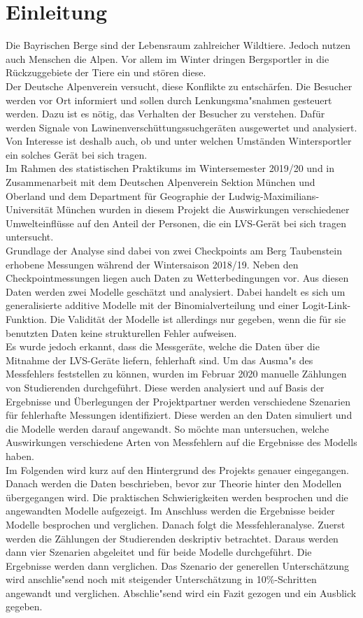 \documentclass[12pt]{scrreprt}
\begin{document}
\chapter{Einleitung}
Die Bayrischen Berge sind der Lebensraum zahlreicher Wildtiere. Jedoch nutzen auch Menschen die Alpen. Vor allem im Winter dringen Bergsportler in die Rückzuggebiete der Tiere ein und stören diese. \\
Der Deutsche Alpenverein versucht, diese Konflikte zu entschärfen. Die Besucher werden vor Ort informiert und sollen durch Lenkungsma"snahmen gesteuert werden. Dazu ist es nötig, das Verhalten der Besucher zu verstehen. Dafür werden Signale von Lawinenverschüttungssuchgeräten ausgewertet und analysiert. Von Interesse ist deshalb auch, ob und unter welchen Umständen Wintersportler ein solches Gerät bei sich tragen. \\
Im Rahmen des statistischen Praktikums im Wintersemester 2019/20 und in Zusammenarbeit mit dem Deutschen Alpenverein Sektion München und Oberland und dem Department für Geographie der Ludwig-Maximilians-Universität München wurden in diesem Projekt die Auswirkungen verschiedener Umwelteinflüsse auf den Anteil der Personen, die ein LVS-Gerät bei sich tragen untersucht. \\
Grundlage der Analyse sind dabei von zwei Checkpoints am Berg Taubenstein erhobene Messungen während der Wintersaison 2018/19. Neben den Checkpointmessungen liegen auch Daten zu Wetterbedingungen vor. Aus diesen Daten werden zwei Modelle geschätzt und analysiert. Dabei handelt es sich um generalisierte additive Modelle mit der Binomialverteilung und einer Logit-Link-Funktion. Die Validität der Modelle ist allerdings nur gegeben, wenn die für sie benutzten Daten keine strukturellen Fehler aufweisen. \\
Es wurde jedoch erkannt, dass die Messgeräte, welche die Daten über die Mitnahme der LVS-Geräte liefern, fehlerhaft sind. Um das Ausma"s des Messfehlers feststellen zu können, wurden im Februar 2020 manuelle Zählungen von Studierenden durchgeführt. Diese werden analysiert und auf Basis der Ergebnisse und Überlegungen der Projektpartner werden verschiedene Szenarien für fehlerhafte Messungen identifiziert. Diese werden an den Daten simuliert und die Modelle werden darauf angewandt. So möchte man untersuchen, welche Auswirkungen verschiedene Arten von Messfehlern auf die Ergebnisse des Modells haben. \\
Im Folgenden wird kurz auf den Hintergrund des Projekts genauer eingegangen. Danach werden die Daten beschrieben, bevor zur Theorie hinter den Modellen übergegangen wird. Die praktischen Schwierigkeiten werden besprochen und die angewandten Modelle aufgezeigt. Im Anschluss werden die Ergebnisse beider Modelle besprochen und verglichen. Danach folgt die Messfehleranalyse. Zuerst werden die Zählungen der Studierenden deskriptiv betrachtet. Daraus werden dann vier Szenarien abgeleitet und für beide Modelle durchgeführt. Die Ergebnisse werden dann verglichen. Das Szenario der generellen Unterschätzung wird anschlie"send noch mit steigender Unterschätzung in 10\%-Schritten angewandt und verglichen. Abschlie"send wird ein Fazit gezogen und ein Ausblick gegeben.
\end{document}
